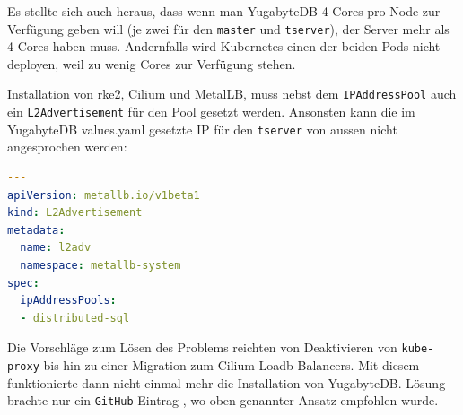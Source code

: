 \begin{flushleft}
    Es stellte sich auch heraus, dass wenn man YugabyteDB 4 Cores pro Node zur Verfügung geben will (je zwei für den \texttt{master} und \texttt{tserver}),
    der Server mehr als 4 Cores haben muss.
    Andernfalls wird Kubernetes einen der beiden Pods nicht deployen, weil zu wenig Cores zur Verfügung stehen.
\end{flushleft}
\begin{flushleft}
    Installation von \gls{rke2}, \Gls{Cilium} und \Gls{MetalLB}, muss nebst dem \texttt{IPAddressPool} auch ein \texttt{L2Advertisement} für den Pool gesetzt werden.
    Ansonsten kann die im YugabyteDB values.yaml gesetzte IP für den \texttt{tserver} von aussen nicht angesprochen werden:
    \lstset{style=gra_codestyle}
    \begin{lstlisting}[language=yaml, caption=metallb - Konfig YAML - Detail L2Advertisement,captionpos=b,label={lst:metallb-l2advertisement-setting},breaklines=true]
---
apiVersion: metallb.io/v1beta1
kind: L2Advertisement
metadata:
  name: l2adv
  namespace: metallb-system
spec:
  ipAddressPools:
  - distributed-sql
    \end{lstlisting}
    Die Vorschläge zum Lösen des Problems reichten von Deaktivieren von \texttt{kube-proxy} bis hin zu einer Migration zum \Gls{Cilium}-Loadb-Balancers.
    Mit diesem funktionierte dann nicht einmal mehr die Installation von YugabyteDB.
    Lösung brachte nur ein \texttt{GitHub}-Eintrag \cite{D4IZIEFN}, wo oben genannter Ansatz empfohlen wurde.
\end{flushleft}
